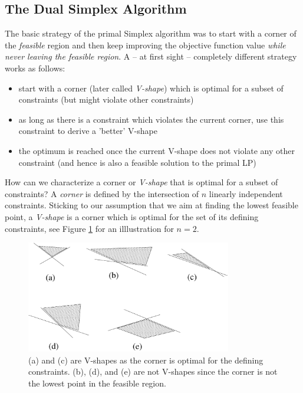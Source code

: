 \documentclass{article}
\begin{document}
\subsection{The Dual Simplex Algorithm}

The basic strategy of the primal Simplex algorithm was to start with a corner of the \emph{feasible} region and then keep improving the objective function value \emph{while never leaving the feasible region}. A -- at first sight -- completely different strategy works as follows:
\begin{itemize}
\item start with a corner (later called \emph{V-shape}) which is optimal for a subset of constraints (but might violate other constraints)
\item as long as there is a constraint which violates the current corner, use this constraint to derive a 'better' V-shape
\item the optimum is reached once the current V-shape does not violate any other constraint (and hence is also a feasible solution to the primal LP)
\end{itemize}

How can we characterize a corner or \emph{V-shape} that is optimal for a subset of constraints? A \emph{corner} is defined by the intersection of $n$ linearly independent constraints. Sticking to our assumption that we aim at finding the lowest feasible point, a \emph{V-shape} is a corner which is optimal for the set of its defining constraints, see Figure \ref{fig:Vshapes} for an illlustration for $n=2$.

\begin{figure}
\begin{center}
\includegraphics[width=0.8\textwidth]{Figs/Vshape.pdf}
\caption{(a) and (c) are V-shapes as the corner is optimal for the defining constraints. (b), (d), and (e) are not V-shapes since the corner is not the lowest point in the feasible region.}\label{fig:Vshapes}
\end{center}
\end{figure}
\end{document}

